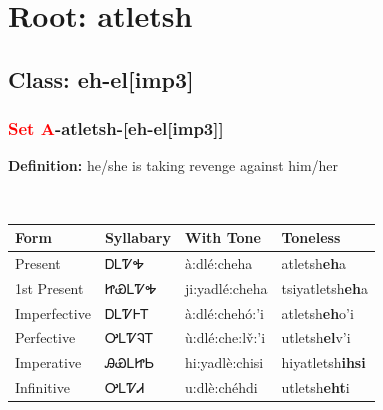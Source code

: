 \needspace{4in}
\section*{Root: atletsh}
\nopagebreak
{}
\needspace{3in}
\subsection*{Class: eh-el[imp3]}
\nopagebreak
\needspace{2in}
\subsubsection*{\textcolor{Red}{Set A}{-}\textbf{atletsh}{-}[eh-el[imp3]]}
\nopagebreak
\textbf{Definition: } he/she is taking revenge against him/her
\\[0.5em]
\begin{tabularx}{\textwidth}{l X X X}%
\toprule%
\textbf{Form}&\textbf{Syllabary}&\textbf{With Tone}&\textbf{Toneless}\\%
\midrule%
Present&ᎠᏞᏤᎭ&à:dlé:cheha&atletsh\textbf{eh}a\\%
1st Present&ᏥᏯᏞᏤᎭ&ji:yadlé:cheha&tsiyatletsh\textbf{eh}a\\%
Imperfective&ᎠᏞᏤᎰᎢ&à:dlé:chehó:’i&atletsh\textbf{eh}o'i\\%
Perfective&ᎤᏞᏤᎸᎢ&ù:dlé:che:lv̌:’i&utletsh\textbf{el}v'i\\%
Imperative&ᎯᏯᏞᏥᏏ&hi:yadlè:chisi&hiyatletsh\textbf{ihsi}\\%
Infinitive&ᎤᏞᏤᏗ&u:dlè:chéhdi&utletsh\textbf{eht}i\\%
\bottomrule%
\end{tabularx}
\\[1em]